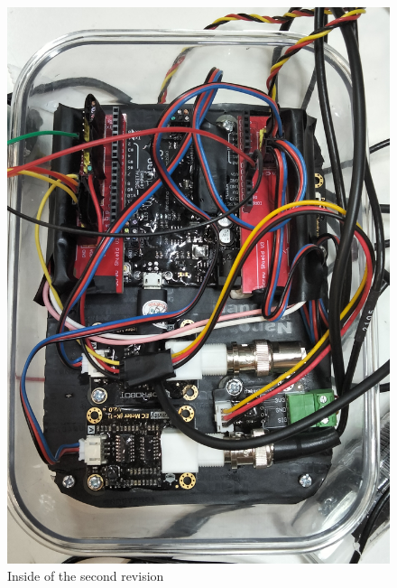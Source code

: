 \begin{figure}[h]
  \centering
  \begin{minipage}[b]{0.4\textwidth}
    \includegraphics[width=\textwidth]{070_design/package/52_rev2.jpg}
    \caption{Inside of the second revision}
  \end{minipage}
  \hfill
  \begin{minipage}[b]{0.5\textwidth}

\end{minipage}
\end{figure}
